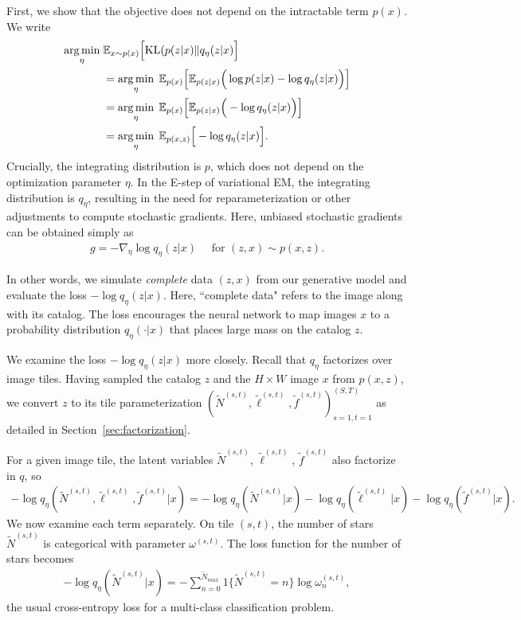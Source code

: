 First, we show that the objective does not depend on the intractable term $p(x)$. 
We write
\begin{align}
 \operatorname*{arg\,min}_{\eta} \; & \mathbb{E}_{x \sim p(x)}\Big[ \mathrm{KL}(p(z | x) \| q_\eta(z | x)\Big] \\
  &=\operatorname*{arg\,min}_{\eta} \; \mathbb E_{p(x)}\Big[\mathbb E_{p(z | x)}\Big(\log p(z | x) - \log q_\eta(z | x) \Big)\Big]\\
&=\operatorname*{arg\,min}_{\eta} \; \mathbb E_{p(x)}\Big[\mathbb E_{p(z | x)}\Big( - \log q_\eta(z | x) \Big)\Big]\\
&=\operatorname*{arg\,min}_{\eta} \; \mathbb E_{p(x, z)}\Big[- \log q_\eta(z | x) \Big]\label{eq:sleep_loss_simple}.
\end{align}
Crucially, the integrating distribution is $p$, which does not depend on the optimization parameter $\eta$.
In the E-step of variational EM, the integrating distribution is $q_\eta$, resulting in the need for reparameterization or other adjustments to compute stochastic gradients. 
Here, unbiased stochastic gradients can be obtained simply as 
\begin{align}
    g = -\nabla_\eta \log q_\eta(z | x) \quad \text{ for } (z, x)\sim p(x, z).
\end{align}

In other words, we simulate {\itshape complete} data $(z, x)$ from our generative model and evaluate the loss $-\log q_\eta(z | x)$. 
Here, ``complete data" refers to the image along with its catalog. 
The loss encourages the neural network to map images $x$ to a probability distribution $q_{\eta}(\cdot | x)$ that places large mass on the catalog $z$.

We examine the loss $-\log q_\eta(z | x)$ more closely. Recall that $q_\eta$ factorizes over image tiles. Having sampled the catalog $z$ 
and the $H\times W$ image $x$ from $p(x,z)$, we convert $z$ to its tile parameterization $(\tilde N^{(s,t)}, \tilde \ell^{(s,t)}, \tilde f^{(s,t)})_{s=1,t=1}^{(S,T)}$ as detailed in Section~\ref{sec:factorization}.

For a given image tile, the latent variables $\tilde N^{(s,t)}$, $\tilde \ell^{(s,t)}$, $\tilde f^{(s,t)}$ also factorize in $q$, so 
\begin{align}
- \log q_\eta(\tilde N^{(s,t)}, 
                \tilde \ell^{(s,t)}, \tilde f^{(s,t)} | x) 
=   - \log q_\eta(\tilde N^{(s,t)} | x) 
        - \log q_\eta(\tilde \ell^{(s,t)} | x) 
        - \log q_\eta(\tilde f^{(s,t)} | x). 
        \label{eq:sleep_loss_decomp}
\end{align}
We now examine each term separately. On tile $(s,t)$, the number of stars $\tilde N^{(s,t)}$ is categorical with parameter $\omega^{(s,t)}$. The loss function for the number of stars becomes
\begin{align}
    - \log q_\eta(\tilde N^{(s,t)} | x) = -\sum_{n = 0}^{\tilde N_{max}} 1\{\tilde N^{(s,t)} = n\} \log \omega^{(s,t)}_n, 
    \label{eq:cross_entropy_loss}
\end{align}
the usual cross-entropy loss for a multi-class classification problem. 


